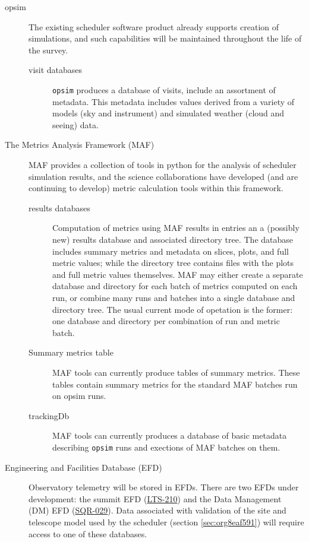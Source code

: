 \begin{description}
\item[{opsim}] The existing scheduler software product already supports creation of simulations, and such capabilities will be maintained throughout the life of the survey.
\begin{description}
\item[{visit databases}] \texttt{opsim} produces a database of visits, include an assortment of metadata. This metadata includes values derived from a variety of models (sky and instrument) and simulated weather (cloud and seeing) data.
\end{description}
\item[{The Metrics Analysis Framework (MAF)}] MAF provides a collection of tools in python for the analysis of scheduler simulation results, and the science collaborations have developed (and are continuing to develop) metric calculation tools within this framework. 
\begin{description}
\item[{results databases}] Computation of metrics using MAF results in entries an a (possibly new) results database and associated directory tree. The database includes summary metrics and metadata on slices, plots, and full metric values; while the directory tree contains files with the plots and full metric values themselves. MAF may either create a separate database and directory for each batch of metrics computed on each run, or combine many runs and batches into a single database and directory tree. The usual current mode of opetation is the former: one database and directory per combination of run and metric batch.
\item[{Summary metrics table}] MAF tools can currently produce tables of summary metrics. These tables contain summary metrics for the standard MAF batches run on opsim runs.
\item[{trackingDb}] MAF tools can currently produces a database of basic metadata describing \texttt{opsim} runs and exections of MAF batches on them.
\end{description}
\item[{Engineering and Facilities Database (EFD)}] Observatory telemetry will be stored in EFDs. There are two EFDs under development: the summit EFD (\href{https://ls.st/LTS-210}{LTS-210}) and the Data Management (DM) EFD (\href{https://sqr-029.lsst.io/}{SQR-029}).  Data associated with validation of the site and telescope model used by the scheduler (section \ref{sec:org8eaf591}) will require access to one of these databases.

\end{description}
